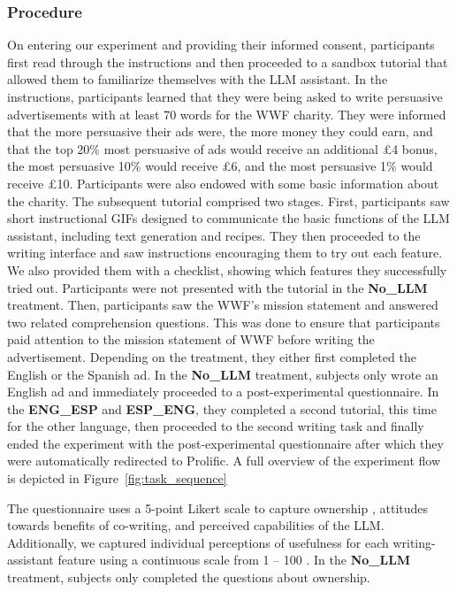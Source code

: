 \subsubsection{Procedure} On entering our experiment and providing their informed consent, participants first read through the instructions and then proceeded to a sandbox tutorial that allowed them to familiarize themselves with the LLM assistant. In the instructions, participants learned that they were being asked to write persuasive advertisements with at least 70 words for the WWF charity. They were informed that the more persuasive their ads were, the more money they could earn, and that the top 20\% most persuasive of ads would receive an additional \pounds4 bonus, the most persuasive 10\% would receive \pounds6, and the most persuasive 1\% would receive \pounds10. Participants were also endowed with some basic information about the charity. The subsequent tutorial comprised two stages. First, participants saw short instructional GIFs designed to communicate the basic functions of the LLM assistant, including text generation and recipes. They then proceeded to the writing interface and saw instructions encouraging them to try out each feature. We also provided them with a checklist, showing which features they successfully tried out. Participants were not presented with the tutorial in the \textbf{No\_LLM} treatment. Then, participants saw the WWF's mission statement and answered two related comprehension questions. 
This was done to ensure that participants paid attention to the mission statement of WWF before writing the advertisement. Depending on the treatment, they either first completed the English or the Spanish ad. In the \textbf{No\_LLM} treatment, subjects only wrote an English ad and immediately proceeded to a post-experimental questionnaire. In the \textbf{ENG\_ESP} and \textbf{ESP\_ENG}, they completed a second tutorial, this time for the other language, then proceeded to the second writing task and finally ended the experiment with the post-experimental questionnaire after which they were automatically redirected to Prolific. A full overview of the experiment flow is depicted in Figure~\ref{fig:task_sequence}

The questionnaire uses a 5-point Likert scale to capture ownership \cite{Wasi2024-uv}, attitudes towards benefits of co-writing, and perceived capabilities of the LLM\cite{Lee2022-dr}. Additionally, we captured individual perceptions of usefulness for each writing-assistant feature using a continuous scale from 1 -- 100 \cite{Ethayarajh2022-gj}. In the \textbf{No\_LLM} treatment, subjects only completed the questions about ownership.



